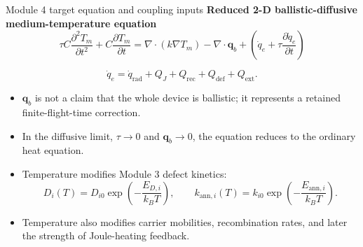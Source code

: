 \documentclass[aspectratio=169,10pt]{beamer}
\begin{document}
\begin{frame}{Module 4 target equation and coupling inputs}
\footnotesize
\textbf{Reduced 2-D ballistic-diffusive medium-temperature equation}
\vspace{-0.25em}
\begin{equation*}
\boxed{
\tau C\frac{\partial^2 T_m}{\partial t^2}
+C\frac{\partial T_m}{\partial t}
=\nabla\cdot(k\nabla T_m)
-\nabla\cdot\mathbf q_b
+\left(\dot q_e+\tau\frac{\partial \dot q_e}{\partial t}\right)
}
\end{equation*}

\vspace{-0.25em}
\begin{equation*}
\dot q_e
=\dot q_{\mathrm{rad}}
+Q_J+Q_{\mathrm{rec}}+Q_{\mathrm{def}}+Q_{\mathrm{ext}}.
\end{equation*}

\vspace{-0.25em}
\begin{itemize}
    \item $\mathbf q_b$ is not a claim that the whole device is ballistic; it represents a retained finite-flight-time correction.
    \item In the diffusive limit, $\tau\rightarrow0$ and $\mathbf q_b\rightarrow0$, the equation reduces to the ordinary heat equation.
    \item Temperature modifies Module 3 defect kinetics:
    \[
        D_i(T)=D_{i0}\exp\!\left(-\frac{E_{D,i}}{k_BT}\right),
        \qquad
        k_{\mathrm{ann},i}(T)=k_{i0}\exp\!\left(-\frac{E_{\mathrm{ann},i}}{k_BT}\right).
    \]
    \item Temperature also modifies carrier mobilities, recombination rates, and later the strength of Joule-heating feedback.
\end{itemize}
\end{frame}
\end{document}
